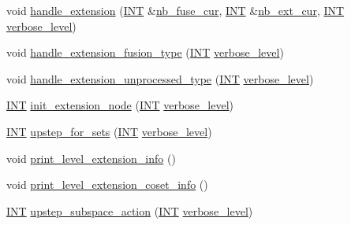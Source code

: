 \begin{DoxyCompactItemize}
\item 
void \mbox{\hyperlink{classupstep__work_ad8ba22a74e9884f92e11340b24e6a6d6}{handle\+\_\+extension}} (\mbox{\hyperlink{galois_8h_a09fddde158a3a20bd2dcadb609de11dc}{I\+NT}} \&\mbox{\hyperlink{classupstep__work_a02ad1f4fe22e4581c48027fb967145cd}{nb\+\_\+fuse\+\_\+cur}}, \mbox{\hyperlink{galois_8h_a09fddde158a3a20bd2dcadb609de11dc}{I\+NT}} \&\mbox{\hyperlink{classupstep__work_a6b017c3e07812bfb1701026f8e538960}{nb\+\_\+ext\+\_\+cur}}, \mbox{\hyperlink{galois_8h_a09fddde158a3a20bd2dcadb609de11dc}{I\+NT}} \mbox{\hyperlink{simeon_8_c_a818073fbcc2f439e7c56952f67386122}{verbose\+\_\+level}})
\item 
void \mbox{\hyperlink{classupstep__work_a36d44fd802b8b56c9ae1d64485e5f396}{handle\+\_\+extension\+\_\+fusion\+\_\+type}} (\mbox{\hyperlink{galois_8h_a09fddde158a3a20bd2dcadb609de11dc}{I\+NT}} \mbox{\hyperlink{simeon_8_c_a818073fbcc2f439e7c56952f67386122}{verbose\+\_\+level}})
\item 
void \mbox{\hyperlink{classupstep__work_a4687dfab87eb7d0646cb79008dd3d32d}{handle\+\_\+extension\+\_\+unprocessed\+\_\+type}} (\mbox{\hyperlink{galois_8h_a09fddde158a3a20bd2dcadb609de11dc}{I\+NT}} \mbox{\hyperlink{simeon_8_c_a818073fbcc2f439e7c56952f67386122}{verbose\+\_\+level}})
\item 
\mbox{\hyperlink{galois_8h_a09fddde158a3a20bd2dcadb609de11dc}{I\+NT}} \mbox{\hyperlink{classupstep__work_ad74931a4c6dc97102d405a755433297d}{init\+\_\+extension\+\_\+node}} (\mbox{\hyperlink{galois_8h_a09fddde158a3a20bd2dcadb609de11dc}{I\+NT}} \mbox{\hyperlink{simeon_8_c_a818073fbcc2f439e7c56952f67386122}{verbose\+\_\+level}})
\item 
\mbox{\hyperlink{galois_8h_a09fddde158a3a20bd2dcadb609de11dc}{I\+NT}} \mbox{\hyperlink{classupstep__work_acbfe3d5e23c38c3dc8f5908e0bc5bf1b}{upstep\+\_\+for\+\_\+sets}} (\mbox{\hyperlink{galois_8h_a09fddde158a3a20bd2dcadb609de11dc}{I\+NT}} \mbox{\hyperlink{simeon_8_c_a818073fbcc2f439e7c56952f67386122}{verbose\+\_\+level}})
\item 
void \mbox{\hyperlink{classupstep__work_a367fb897ab6fe9cd94c511a1931d4dc7}{print\+\_\+level\+\_\+extension\+\_\+info}} ()
\item 
void \mbox{\hyperlink{classupstep__work_a30abe055c26f63cf6279de866b8584dc}{print\+\_\+level\+\_\+extension\+\_\+coset\+\_\+info}} ()
\item 
\mbox{\hyperlink{galois_8h_a09fddde158a3a20bd2dcadb609de11dc}{I\+NT}} \mbox{\hyperlink{classupstep__work_afd45c862c93f460a2e523f074d024529}{upstep\+\_\+subspace\+\_\+action}} (\mbox{\hyperlink{galois_8h_a09fddde158a3a20bd2dcadb609de11dc}{I\+NT}} \mbox{\hyperlink{simeon_8_c_a818073fbcc2f439e7c56952f67386122}{verbose\+\_\+level}})

\end{DoxyCompactItemize}
